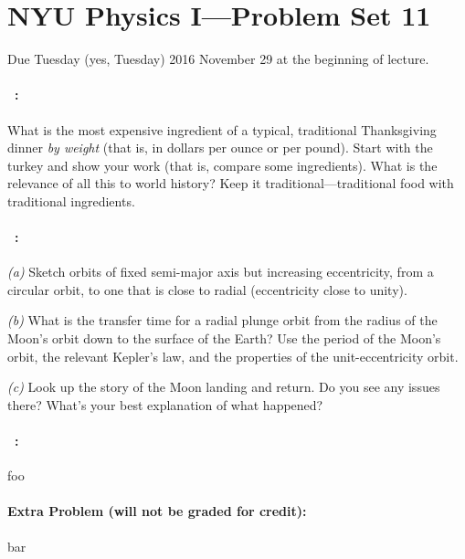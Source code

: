 \documentclass[12pt]{article}
\begin{document}
\section*{NYU Physics I---Problem Set 11}

Due Tuesday (yes, Tuesday) 2016 November 29 at the beginning of lecture.

\paragraph{\problemname~\theproblem:}%
What is the most expensive ingredient of a typical, traditional
Thanksgiving dinner \emph{by weight} (that is, in dollars per ounce or
per pound).  Start with the turkey and show your work (that is,
compare some ingredients). What is the relevance of all this to world
history? Keep it traditional---traditional food with traditional
ingredients.

\paragraph{\problemname~\theproblem:}%
\textsl{(a)} Sketch orbits of fixed semi-major axis but increasing
eccentricity, from a circular orbit, to one that is close to radial
(eccentricity close to unity).

\textsl{(b)} What is the transfer time for a radial plunge orbit
from the radius of the Moon's orbit down to the surface of the Earth?
Use the period of the Moon's orbit, the relevant  Kepler's law, and
the properties of the unit-eccentricity orbit.

\textsl{(c)} Look up the story of the Moon landing and return.
Do you see any issues there? What's your best explanation of what
happened?

\paragraph{\problemname~\theproblem:}%
foo

\paragraph{Extra Problem (will not be graded for credit):}%
bar
\end{document}
